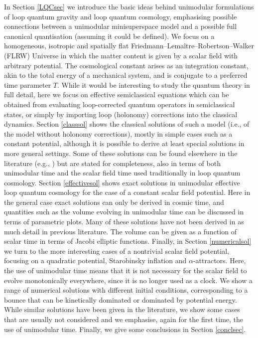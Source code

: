 \documentclass[aps,prd,11pt,showkeys,nofootinbib]{revtex4-2}
\begin{document}
In Section \ref{LQCsec} we introduce the basic ideas behind unimodular formulations of loop quantum gravity and loop quantum cosmology, emphasising possible connections between a unimodular minisuperspace model and a possible full canonical quantisation (assuming it could be defined). We focus on a homogeneous, isotropic and spatially flat Friedmann--Lema\^{i}tre--Robertson--Walker (FLRW) Universe in which the matter content is given by a scalar field with arbitrary potential. The cosmological constant arises as an integration constant, akin to the total energy of a mechanical system, and is conjugate to a preferred time parameter $T$. While it would be interesting to study the quantum theory in full detail, here we focus on effective semiclassical equations which can be obtained from evaluating loop-corrected quantum operators in semiclassical states, or simply by importing loop (holonomy) corrections into the classical dynamics. Section \ref{classsol} shows the classical solutions of such a model (i.e., of the model without holonomy corrections), mostly in simple cases such as a constant potential, although it is possible to derive at least special solutions in more general settings. Some of these solutions can be found elsewhere in the literature (e.g., \cite{Gielen:2020abd}) but are stated for completeness, also in terms of both unimodular time and the scalar field time used traditionally in loop quantum cosmology. Section \ref{effectivesol} shows exact solutions in unimodular effective loop quantum cosmology for the case of a constant scalar field potential. Here in the general case exact solutions can only be derived in cosmic time, and quantities such as the volume evolving in unimodular time can be discussed in terms of parametric plots. Many of these solutions have not been derived in as much detail in previous literature. The volume can be given as a function of scalar time in terms of Jacobi elliptic functions. Finally, in Section \ref{numericalsol} we turn to the more interesting cases of a nontrivial scalar field potential, focusing on a quadratic potential, Starobinsky inflation and $\alpha$-attractors. Here, the use of unimodular time means that it is not necessary for the scalar field to evolve monotonically everywhere, since it is no longer used as a clock. We show a range of numerical solutions with different initial conditions, corresponding to a bounce that can be kinetically dominated or dominated by potential energy. While similar solutions have been given in the literature, we show some cases that are usually not considered and we emphasise, again for the first time, the use of unimodular time. Finally, we give some conclusions in Section \ref{conclsec}. 
\end{document}
